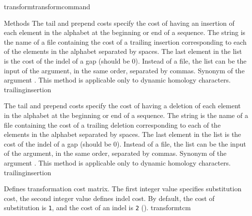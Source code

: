 \begin{command}{transform}{transformcommand}
\begin{arguments}
\begin{argumentgroup}{Methods}
            {The tail and prepend costs specify the cost of having an insertion of
            each element in the alphabet at the beginning or end
            of a sequence. The string is the name of a file containing the cost of
            a trailing insertion corresponding to each of the elements
            in the alphabet separated by spaces. The last element in the list is the
            cost of the indel of a gap (should be 0). Instead of a file, the list can
            be the input of the argument, in the same order, separated by commas.
            Synonym of the argument . This method is applicable only to dynamic homology characters.} 
            {trailinginsertion}

            {The tail and prepend costs specify the cost of having a deletion
            of each element in the alphabet at the beginning or end
            of a sequence. The string is the name of a file containing the cost of
            a trailing deletion corresponding to each of the elements
            in the alphabet separated by spaces. The last element in the list is the
            cost of the indel of a gap (should be 0). Instead of a file, the list can
            be the input of the argument, in the same order, separated by commas.
            Synonym of the argument . This method is applicable only to dynamic homology characters.} 
            {trailinginsertion}

            {Defines transformation cost matrix. The first integer value specifies
            substitution cost, the second integer value defines indel cost. By default,
            the cost of substitution is \texttt{1}, and the cost of an indel is \texttt{2}
            ().}
            {transformtcm}


\end{argumentgroup}
\end{arguments}
\end{command}
